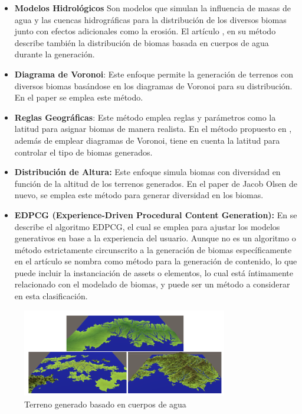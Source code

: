 \begin{itemize}
                \begin{itemize}
                    \item \textbf{Modelos Hidrológicos} Son modelos que simulan la influencia de masas de agua  y las cuencas hidrográficas para la distribución de los diversos biomas junto con efectos adicionales como la erosión. El artículo \cite{Fischer2022}, en su método describe también la distribución de biomas basada en cuerpos de agua durante la generación.
                    \item \textbf{Diagrama de Voronoi}: Este enfoque permite la generación de terrenos con diversos biomas basándose en los diagramas de Voronoi para su distribución. En el paper \cite{olsen2004realtime} se emplea este método.
                    \item \textbf{Reglas Geográficas}: Este método emplea reglas y parámetros como la latitud para asignar biomas de manera realista. En el método propuesto en \cite{Choros2016}, además de emplear diagramas de Voronoi, tiene en cuenta la latitud para controlar el tipo de biomas generados. 
                    \item \textbf{Distribución de Altura:} Este enfoque simula biomas con diversidad en función de la altitud de los terrenos generados. En el paper de Jacob Olsen \cite{olsen2004realtime} de nuevo, se emplea este método para generar diversidad en los biomas.
                    \item \textbf{EDPCG (Experience-Driven Procedural Content Generation):} En \cite{AnalisisAlgoritmosAmbientesVirtuales} se describe el algoritmo EDPCG, el cual se emplea para ajustar los modelos generativos en base a la experiencia del usuario. Aunque no es un algoritmo o método estrictamente circunscrito a la generación de biomas específicamente en el artículo se nombra como método para la generación de contenido, lo que puede incluir la instanciación de assets o elementos, lo cual está íntimamente relacionado con el modelado de biomas, y puede ser un método a considerar en esta clasificación.
                \end{itemize}

                \begin{figure}[h]
                    \centering
                    \includegraphics[width=0.8\textwidth]{img/procedural landscape with watrerbodies.png}
                    \caption{Terreno generado basado en cuerpos de agua \cite{Fischer2022}}
                \end{figure}
                

\end{itemize}
